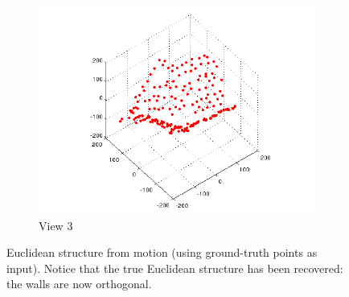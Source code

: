 \documentclass[a4paper,10pt]{article}
\begin{document}
\begin{figure}[h!tb]
\begin{subfigure}{0.3\textwidth}
                \centering
                \includegraphics[width=\textwidth]{EuclideanStructure3}
                \caption{View 3}
        \end{subfigure}
\caption{Euclidean structure from motion (using ground-truth points as input). Notice that the true Euclidean structure has been recovered: the walls are now orthogonal.}
\label{fig:Euclidean}      
\end{figure}
\end{document}
